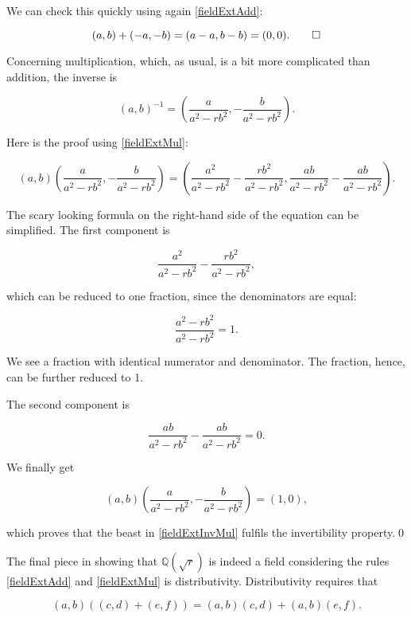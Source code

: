 \documentclass[tikz]{scrreprt}
\begin{document}
We can check this quickly using again \ref{fieldExtAdd}:

\begin{equation}
(a,b) + (-a,-b)= (a-a,b-b)=(0,0).\qed
\end{equation}

Concerning multiplication, which, as usual, is a bit
more complicated than addition, the inverse is

\begin{equation}\label{fieldExtInvMul}
(a,b)^{-1} = \left(\frac{a}{a^2-rb^2},-\frac{b}{a^2-rb^2}\right).
\end{equation}

Here is the proof using \ref{fieldExtMul}:

\begin{equation}
\left(a,b\right)\left(\frac{a}{a^2-rb^2},-\frac{b}{a^2-rb^2}\right) = 
\left(\frac{a^2}{a^2-rb^2} - \frac{rb^2}{a^2-rb^2}, 
\frac{ab}{a^2-rb^2} - \frac{ab}{a^2-rb^2}\right). 
\end{equation}

The scary looking formula on the right-hand side of the equation
can be simplified. The first component is

\[
\frac{a^2}{a^2-rb^2} - \frac{rb^2}{a^2-rb^2},
\]

which can be reduced to one fraction,
since the denominators are equal:

\[
\frac{a^2-rb^2}{a^2-rb^2} = 1.
\]

We see a fraction with identical numerator and denominator.
The fraction, hence, can be further reduced to 1.

The second component is

\[
\frac{ab}{a^2-rb^2} - \frac{ab}{a^2-rb^2}=0.
\]

We finally get

\begin{equation}
\left(a,b\right)\left(\frac{a}{a^2-rb^2},-\frac{b}{a^2-rb^2}\right) = (1,0),
\end{equation}

which proves that the beast in \ref{fieldExtInvMul} fulfils
the invertibility property.\qed

The final piece in showing that $\mathbb{Q}(\sqrt{r})$ is indeed
a field considering the rules \ref{fieldExtAdd} and \ref{fieldExtMul}
is distributivity. Distributivity requires that

\begin{equation}
(a,b)((c,d) + (e,f)) = (a,b)(c,d) + (a,b)(e,f).
\end{equation}
\end{document}

